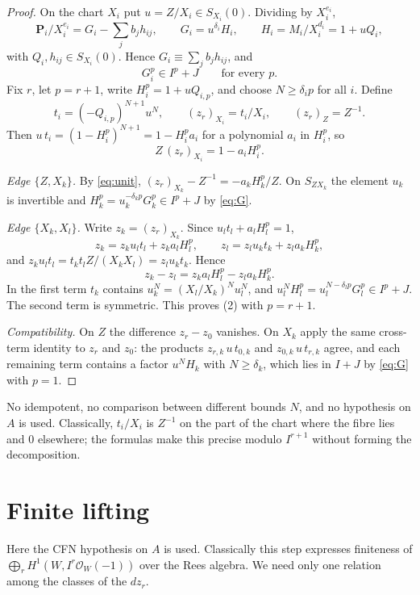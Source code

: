 \documentclass[11pt]{amsart}
\numberwithin{equation}{section}
\theoremstyle{definition}
\theoremstyle{remark}
\begin{document}
\begin{proof}
On the chart $X_i$ put $u=Z/X_i\in S_{X_i}(0)$. Dividing by
$X_i^{e_i}$,
\[
 \mathbf P_i/X_i^{e_i}=G_i-\sum_jb_jh_{ij},\qquad
 G_i=u^{\delta_i}H_i,\qquad H_i=M_i/X_i^{d_i}=1+uQ_i,
\]
with $Q_i,h_{ij}\in S_{X_i}(0)$. Hence $G_i\equiv\sum_jb_jh_{ij}$, and
\begin{equation}\label{eq:G}
 G_i^p\in I^p+J\qquad\text{for every }p.
\end{equation}
Fix $r$, let $p=r+1$, write $H_i^p=1+uQ_{i,p}$, and choose
$N\ge\delta_ip$ for all $i$. Define
\[
 t_i=(-Q_{i,p})^{N+1}u^N,\qquad (z_r)_{X_i}=t_i/X_i,\qquad (z_r)_Z=Z^{-1}.
\]
Then $u\,t_i=(1-H_i^p)^{N+1}=1-H_i^pa_i$ for a polynomial $a_i$ in
$H_i^p$, so
\begin{equation}\label{eq:unit}
 Z\,(z_r)_{X_i}=1-a_iH_i^p .
\end{equation}

\emph{Edge $\{Z,X_k\}$.} By \eqref{eq:unit},
$(z_r)_{X_k}-Z^{-1}=-a_kH_k^p/Z$. On $S_{ZX_k}$ the element $u_k$ is
invertible and $H_k^p=u_k^{-\delta_kp}G_k^p\in I^p+J$ by \eqref{eq:G}.

\emph{Edge $\{X_k,X_l\}$.} Write $z_k=(z_r)_{X_k}$. Since
$u_lt_l+a_lH_l^p=1$,
\[
 z_k=z_ku_lt_l+z_ka_lH_l^p,\qquad z_l=z_lu_kt_k+z_la_kH_k^p,
\]
and $z_ku_lt_l=t_kt_lZ/(X_kX_l)=z_lu_kt_k$. Hence
\[
 z_k-z_l=z_ka_lH_l^p-z_la_kH_k^p .
\]
In the first term $t_k$ contains $u_k^N=(X_l/X_k)^Nu_l^N$, and
$u_l^NH_l^p=u_l^{N-\delta_lp}G_l^p\in I^p+J$. The second term is
symmetric. This proves (2) with $p=r+1$.

\emph{Compatibility.} On $Z$ the difference $z_r-z_0$ vanishes. On
$X_k$ apply the same cross-term identity to $z_r$ and $z_0$: the
products $z_{r,k}\,u\,t_{0,k}$ and $z_{0,k}\,u\,t_{r,k}$ agree, and
each remaining term contains a factor $u^{N}H_k$ with $N\ge\delta_k$,
which lies in $I+J$ by \eqref{eq:G} with $p=1$.
\end{proof}

No idempotent, no comparison between different bounds $N$, and no
hypothesis on $A$ is used. Classically, $t_i/X_i$ is $Z^{-1}$ on the
part of the chart where the fibre lies and $0$ elsewhere; the formulas
make this precise modulo $I^{r+1}$ without forming the decomposition.

\section{Finite lifting}\label{sec:lifting}

Here the CFN hypothesis on $A$ is used. Classically this step expresses
finiteness of $\bigoplus_rH^1(W,I^r\mathcal O_W(-1))$ over the Rees
algebra. We need only one relation among the classes of the $dz_r$.
\end{document}
